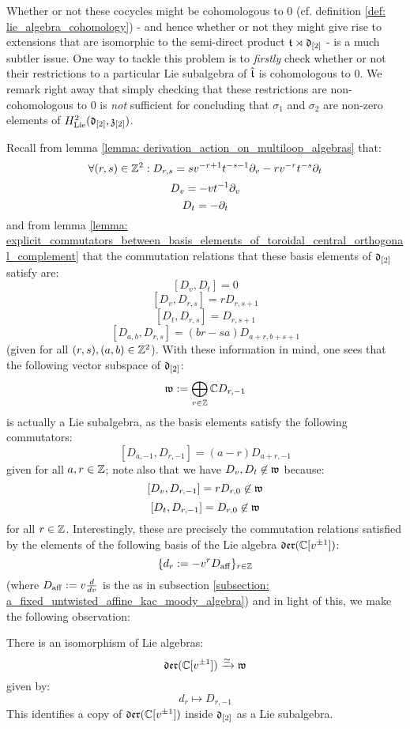         Whether or not these cocycles might be cohomologous to $0$ (cf. definition \ref{def: lie_algebra_cohomology}) - and hence whether or not they might give rise to extensions that are isomorphic to the semi-direct product $\mathfrak{t} \rtimes \mathfrak{d}_{[2]}$ - is a much subtler issue. One way to tackle this problem is to \textit{firstly} check whether or not their restrictions to a particular Lie subalgebra of $\hat{\mathfrak{t}}$ is cohomologous to $0$. We remark right away that simply checking that these restrictions are non-cohomologous to $0$ is \textit{not} sufficient for concluding that $\sigma_1$ and $\sigma_2$ are non-zero elements of $H^2_{\mathrm{Lie}}(\mathfrak{d}_{[2]}, \mathfrak{z}_{[2]})$.

        Recall from lemma \ref{lemma: derivation_action_on_multiloop_algebras} that:
            $$\forall (r, s) \in \mathbb{Z}^2: D_{r, s} = s v^{-r + 1} t^{-s - 1} \partial_v - r v^{-r} t^{-s} \partial_t$$
            $$D_v = -v t^{-1} \partial_v$$
            $$D_t = -\partial_t$$
        and from lemma \ref{lemma: explicit_commutators_between_basis_elements_of_toroidal_central_orthogonal_complement} that the commutation relations that these basis elements of $\mathfrak{d}_{[2]}$ satisfy are:
            $$[D_v, D_t] = 0$$
            $$[D_v, D_{r, s}] = r D_{r, s + 1}$$
            $$[D_t, D_{r, s}] = D_{r, s + 1}$$
            $$[D_{a, b}, D_{r, s}] = (br - sa) D_{a + r, b + s + 1}$$
        (given for all $(r, s), (a, b) \in \mathbb{Z}^2$). With these information in mind, one sees that the following vector subspace of $\mathfrak{d}_{[2]}$:
            $$\mathfrak{w} := \bigoplus_{r \in \mathbb{Z}} \mathbb{C} D_{r, -1}$$
        is actually a Lie subalgebra, as the basis elements satisfy the following commutators:
            $$[D_{a, -1}, D_{r, -1}] = (a - r) D_{a + r, -1}$$
        given for all $a, r \in \mathbb{Z}$; note also that we have $D_v, D_t \not \in \mathfrak{w}$ because:
            $$[D_v, D_{r, -1}] = r D_{r, 0} \not \in \mathfrak{w}$$
            $$[D_t, D_{r, -1}] = D_{r, 0} \not \in \mathfrak{w}$$    
        for all $r \in \mathbb{Z}$. Interestingly, these are precisely the commutation relations satisfied by the elements of the following basis of the Lie algebra $\mathfrak{der}(\mathbb{C}[v^{\pm 1}])$:
            $$\{ d_r := -v^r D_{\mathrm{aff}} \}_{r \in \mathbb{Z}}$$
        (where $D_{\mathrm{aff}} := v \frac{d}{dv}$ is the  as in subsection \ref{subsection: a_fixed_untwisted_affine_kac_moody_algebra}) and in light of this, we make the following observation:
        \begin{lemma} \label{lemma: a_copy_of_the_witt_algebra_inside_the_lie_algebra_of_yangian_div_zero_vector_fields}
            There is an isomorphism of Lie algebras:
                $$\mathfrak{der}(\mathbb{C}[v^{\pm 1}]) \xrightarrow[]{\simeq} \mathfrak{w}$$
            given by:
                $$d_r \mapsto D_{r, -1}$$
            This identifies a copy of $\mathfrak{der}(\mathbb{C}[v^{\pm 1}])$ inside $\mathfrak{d}_{[2]}$ as a Lie subalgebra. 
        \end{lemma}

